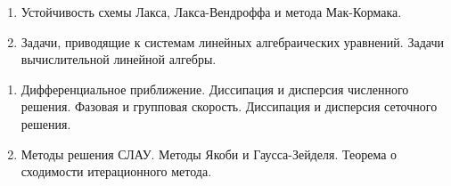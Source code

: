 \documentclass[14pt,a4paper]{extarticle}
\begin{document}
    \begin{enumerate}

         \item Устойчивость схемы Лакса, Лакса-Вендроффа и метода Мак-Кормака.

         \item Задачи, приводящие к системам линейных алгебраических уравнений. Задачи вычислительной линейной алгебры.

    \end{enumerate}


    \begin{enumerate}

         \item Дифференциальное приближение. Диссипация и дисперсия численного решения. Фазовая и групповая скорость. Диссипация и дисперсия сеточного решения.

         \item Методы решения СЛАУ. Методы Якоби и Гаусса-Зейделя. Теорема о сходимости итерационного метода.

    \end{enumerate}
\end{document}
